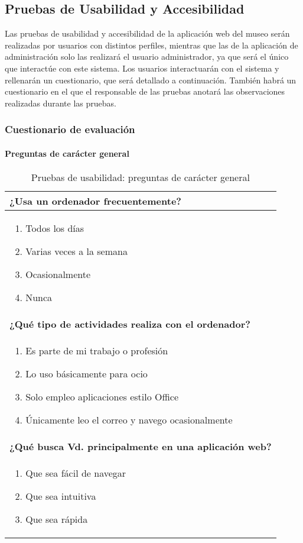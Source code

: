\subsection{Pruebas de Usabilidad y Accesibilidad} 
Las pruebas de usabilidad y accesibilidad de la aplicación web del museo serán realizadas por usuarios con distintos perfiles, mientras que las de la aplicación de administración solo las realizará el usuario administrador, ya que será el único que interactúe con este sistema. Los usuarios interactuarán con el sistema y rellenarán un cuestionario, que será detallado a continuación. También habrá un cuestionario en el que el responsable de las pruebas anotará las observaciones realizadas durante las pruebas.

\subsubsection{Cuestionario de evaluación} 
\paragraph*{Preguntas de carácter general}
\begin{table}[H]
\centering
\caption{Pruebas de usabilidad: preguntas de carácter general}
\begin{tabular}{p{36em}}
\toprule
\rowcolor[rgb]{ .949,  .949,  .949} \textbf{¿Usa un ordenador frecuentemente?} \\ \midrule
\vspace{-4mm}
\begin{enumerate}
\item Todos los días
\item Varias veces a la semana
\item Ocasionalmente
\item Nunca
\end{enumerate} \\ \midrule
\rowcolor[rgb]{ .949,  .949,  .949} \textbf{¿Qué tipo de actividades realiza con el ordenador?} \\ \midrule
\vspace{-4mm}
\begin{enumerate}
\item Es parte de mi trabajo o profesión
\item Lo uso básicamente para ocio
\item Solo empleo aplicaciones estilo Office
\item Únicamente leo el correo y navego ocasionalmente
\end{enumerate} \\ \midrule
\rowcolor[rgb]{ .949,  .949,  .949} \textbf{¿Qué busca Vd. principalmente en una aplicación web?} \\ \midrule
\vspace{-4mm}
\begin{enumerate}
\item Que sea fácil de navegar
\item Que sea intuitiva
\item Que sea rápida
\end{enumerate} \\ \bottomrule
\end{tabular}
\end{table}

